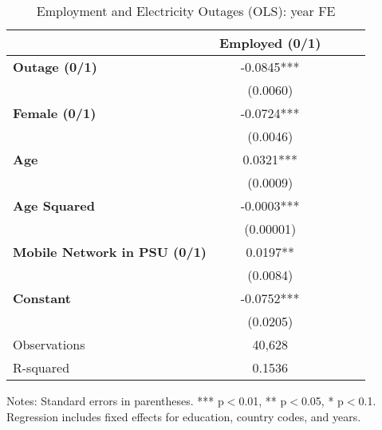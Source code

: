 \documentclass{article}
\begin{document}
\begin{table}[htbp]
\centering
\caption{Employment and Electricity Outages (OLS): year FE}
\label{tab:employment_outages}
\begin{threeparttable}
\begin{tabular}{lcccc}
\toprule
 & \textbf{Employed (0/1)} \\ 
\midrule
\textbf{Outage (0/1)} & -0.0845*** \\ 
 & (0.0060) \\ 
\textbf{Female (0/1)} & -0.0724*** \\ 
 & (0.0046) \\ 
\textbf{Age} & 0.0321*** \\ 
 & (0.0009) \\ 
\textbf{Age Squared} & -0.0003*** \\ 
 & (0.00001) \\ 
\textbf{Mobile Network in PSU (0/1)} & 0.0197** \\ 
 & (0.0084) \\ 
\textbf{Constant} & -0.0752*** \\ 
 & (0.0205) \\ 
\midrule
Observations & 40,628 \\ 
R-squared & 0.1536 \\ 
\bottomrule
\end{tabular}

\begin{tablenotes}
\footnotesize
\item Notes: Standard errors in parentheses. *** p$<$0.01, ** p$<$0.05, * p$<$0.1. Regression includes fixed effects for education, country codes, and years.
\end{tablenotes}
\end{threeparttable}
\end{table}
\end{document}
